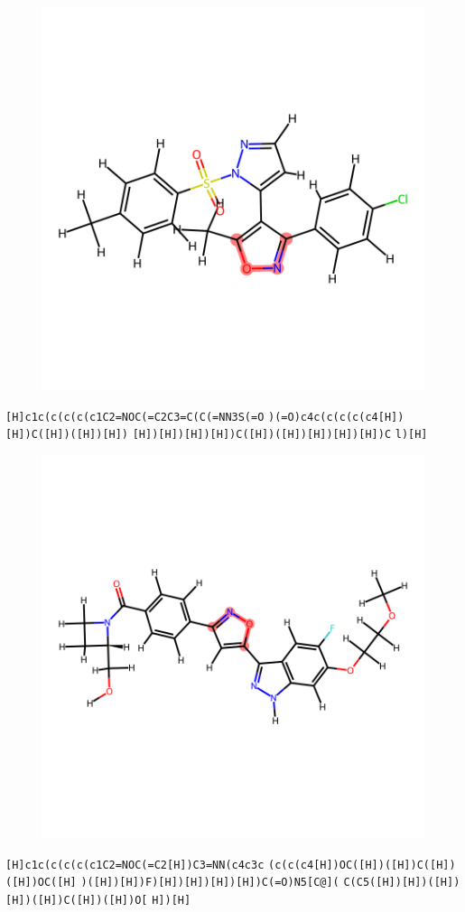 \documentclass{article}
\begin{document}
\begin{figure}[ht]
\centering
    \includegraphics{mol188.png}
\end{figure}
\verb|[H]c1c(c(c(c(c1C2=NOC(=C2C3=C(C(=NN3S(=O| \verb|)(=O)c4c(c(c(c(c4[H])[H])C([H])([H])[H])| \verb|[H])[H])[H])[H])C([H])([H])[H])[H])[H])C| \verb|l)[H]|

\begin{figure}[ht]
\centering
    \includegraphics{mol189.png}
\end{figure}
\verb|[H]c1c(c(c(c(c1C2=NOC(=C2[H])C3=NN(c4c3c| \verb|(c(c(c4[H])OC([H])([H])C([H])([H])OC([H]| \verb|)([H])[H])F)[H])[H])[H])[H])C(=O)N5[C@](| \verb|C(C5([H])[H])([H])[H])([H])C([H])([H])O[| \verb|H])[H]|
\end{document}
